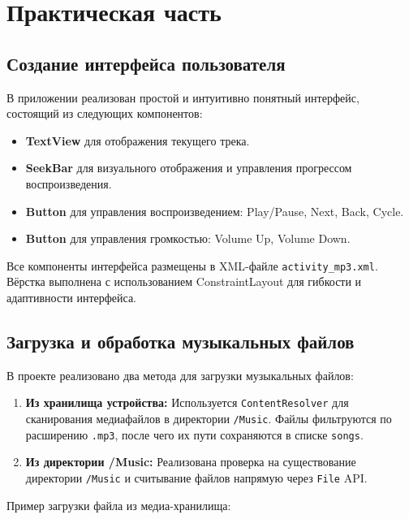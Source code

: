 \chapter{Практическая часть}

\section{Создание интерфейса пользователя}

В приложении реализован простой и интуитивно понятный интерфейс, состоящий из следующих компонентов:

\begin{itemize}
    \item \textbf{TextView} для отображения текущего трека.
    \item \textbf{SeekBar} для визуального отображения и управления прогрессом воспроизведения.
    \item \textbf{Button} для управления воспроизведением: Play/Pause, Next, Back, Cycle.
    \item \textbf{Button} для управления громкостью: Volume Up, Volume Down.
\end{itemize}

Все компоненты интерфейса размещены в XML-файле \texttt{activity\_mp3.xml}. Вёрстка выполнена с использованием ConstraintLayout для гибкости и адаптивности интерфейса.

\section{Загрузка и обработка музыкальных файлов}

В проекте реализовано два метода для загрузки музыкальных файлов:

\begin{enumerate}
    \item \textbf{Из хранилища устройства:}  
    Используется \texttt{ContentResolver} для сканирования медиафайлов в директории \texttt{/Music}. Файлы фильтруются по расширению \texttt{.mp3}, после чего их пути сохраняются в списке \texttt{songs}.

    \item \textbf{Из директории /Music:}  
    Реализована проверка на существование директории \texttt{/Music} и считывание файлов напрямую через \texttt{File} API.
\end{enumerate}

Пример загрузки файла из медиа-хранилища:


